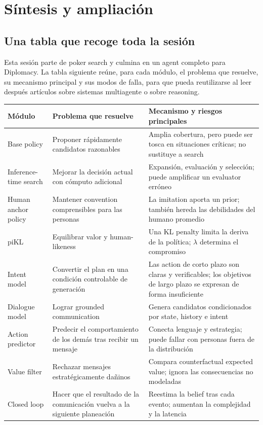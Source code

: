 \section{Síntesis y ampliación}

\subsection{Una tabla que recoge toda la sesión}

Esta sesión parte de poker search y culmina en un agent completo para Diplomacy. La tabla siguiente reúne, para cada módulo, el problema que resuelve, su mecanismo principal y sus modos de falla, para que pueda reutilizarse al leer después artículos sobre sistemas multiagente o sobre reasoning.

\begin{longtable}{L{0.20\textwidth}L{0.30\textwidth}L{0.40\textwidth}}
\toprule
Módulo & Problema que resuelve & Mecanismo y riesgos principales \\
\midrule
Base policy & Proponer rápidamente candidatos razonables & Amplia cobertura, pero puede ser tosca en situaciones críticas; no sustituye a search \\
Inference-time search & Mejorar la decisión actual con cómputo adicional & Expansión, evaluación y selección; puede amplificar un evaluator erróneo \\
Human anchor policy & Mantener convention comprensibles para las personas & La imitation aporta un prior; también hereda las debilidades del humano promedio \\
piKL & Equilibrar valor y human-likeness & Una KL penalty limita la deriva de la política; $\lambda$ determina el compromiso \\
Intent model & Convertir el plan en una condición controlable de generación & Las action de corto plazo son claras y verificables; los objetivos de largo plazo se expresan de forma insuficiente \\
Dialogue model & Lograr grounded communication & Genera candidatos condicionados por state, history e intent \\
Action predictor & Predecir el comportamiento de los demás tras recibir un mensaje & Conecta lenguaje y estrategia; puede fallar con personas fuera de la distribución \\
Value filter & Rechazar mensajes estratégicamente dañinos & Compara counterfactual expected value; ignora las consecuencias no modeladas \\
Closed loop & Hacer que el resultado de la comunicación vuelva a la siguiente planeación & Reestima la belief tras cada evento; aumentan la complejidad y la latencia \\
\bottomrule
\end{longtable}

